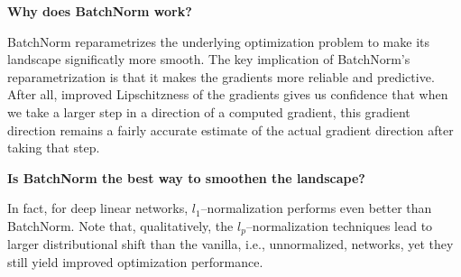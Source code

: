 \textbf{Why does BatchNorm work?}


BatchNorm reparametrizes the underlying optimization problem to make its landscape significatly more smooth.
The key implication of BatchNorm's reparametrization is that it makes the gradients more reliable and predictive.
After all, improved Lipschitzness of the gradients gives us confidence that when we take a larger step in a direction
of a computed gradient, this gradient direction remains a fairly accurate estimate of the actual gradient direction after
taking that step.

\textbf{Is BatchNorm the best way to smoothen the landscape?}

In fact, for deep linear networks, $l_1$–normalization performs even better than BatchNorm. Note that,
qualitatively, the $l_p$–normalization techniques lead to larger distributional shift than the vanilla,
 i.e., unnormalized, networks, yet they still yield improved optimization performance.
